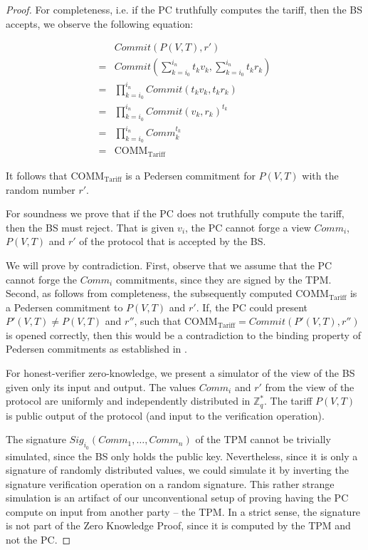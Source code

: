 \documentclass[english]{llncs}
\begin{document}
\begin{proof}
For completeness, i.e. if the PC truthfully computes the tariff, then the BS accepts, we observe the following equation:

\begin{equation*}
\begin{split}
  & Commit(P(V,T), r\prime) \\
= & Commit(\sum_{k=i_0}^{i_n} t_k v_k, \sum_{k=i_0}^{i_n} t_k r_k)\\
= & \prod_{k=i_0}^{i_n} Commit(t_k v_k, t_k r_k) \\
= & \prod_{k=i_0}^{i_n} Commit(v_k, r_k)^{t_k} \\
= & \prod_{k=i_0}^{i_n} Comm_k^{t_k} \\
= & \text{COMM}_{\text{Tariff}}
\end{split}
\end{equation*}

It follows that $\text{COMM}_{\text{Tariff}}$ is a Pedersen commitment for $P(V,T)$ with the random number $r'$.

For soundness we prove that if the PC does not truthfully compute the tariff, then the BS must reject.
That is given $v_i$, the PC cannot forge a view $Comm_i$, $P(V, T)$ and $r'$ of the protocol that is accepted by the BS.

We will prove by contradiction.
First, observe that we assume that the PC cannot forge the $Comm_i$ commitments, since they are signed by the TPM.
Second, as follows from completeness, the subsequently computed $\text{COMM}_{\text{Tariff}}$ is a Pedersen commitment to $P(V,T)$ and $r'$.
If, the PC could present $P'(V,T) \neq P(V,T)$ and $r''$, such that $\text{COMM}_{\text{Tariff}} = Commit(P'(V,T), r'')$ is opened correctly, then this would be a contradiction to the binding property of Pedersen commitments as established in \cite{Ped}.

For honest-verifier zero-knowledge, we present a simulator of the view of the BS given only its input and output.
The values $Comm_i$ and $r'$ from the view of the protocol are uniformly and independently distributed in $\mathbb{Z}^*_q$.
The tariff $P(V, T)$ is public output of the protocol (and input to the verification operation).

The signature $Sig_{i_0}(Comm_1, \ldots, Comm_n)$ of the TPM cannot be trivially simulated, since the BS only holds the public key.
Nevertheless, since it is only a signature of randomly distributed values, we could simulate it by inverting the signature verification operation on a random signature.
This rather strange simulation is an artifact of our unconventional setup of proving having the PC compute on input from another party -- the TPM.
In a strict sense, the signature is not part of the Zero Knowledge Proof, since it is computed by the TPM and not the PC.

\end{proof}
\end{document}

